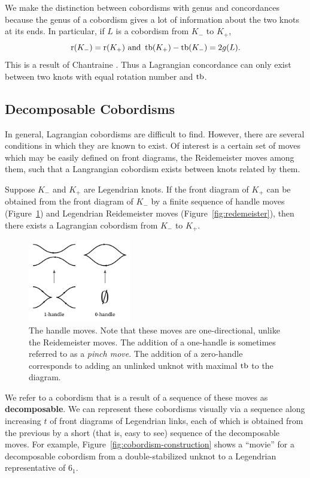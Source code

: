 We make the distinction between cobordisms with genus and concordances because the genus of a cobordism gives a lot of information about the two knots at its ends.
In particular, if $L$ is a cobordism from $K_-$ to $K_+$,
\[
    \operatorname{r}(K_-) = \operatorname{r}(K_+) \text{     and     } \operatorname{tb}(K_+) - \operatorname{tb}(K_-) = 2g(L).
\]
This is a result of Chantraine \cite{chantraine2010}. Thus a Lagrangian concordance can only exist between two knots with equal rotation number and $\operatorname{tb}$.


\subsection{Decomposable Cobordisms}\label{subsec:decomposable}

In general, Lagrangian cobordisms are difficult to find. However, there are several conditions in which they are known to exist. Of interest is a certain set of moves which may be easily defined on front diagrams, the Reidemeister moves among them, such that a Langrangian cobordism exists between knots related by them.

\begin{theorem}
    Suppose $K_-$ and $K_+$ are Legendrian knots. If the front diagram of $K_+$ can be obtained from the front diagram of $K_-$ by a finite sequence of handle moves (Figure~\ref{fig:handles}) and Legendrian Reidemeister moves (Figure~\ref{fig:redemeister}), then there exists a Lagrangian cobordism from $K_-$ to $K_+$. 
\end{theorem}
\begin{figure}[ht!]
    \centering
    \includegraphics[width=0.4\textwidth]{images/handles.pdf}
    \caption{The handle moves. Note that these moves are one-directional, unlike the Reidemeister moves. The addition of a one-handle is sometimes referred to as a \emph{pinch move}. The addition of a zero-handle corresponds to adding an unlinked unknot with maximal $\operatorname{tb}$ to the diagram.}
    \label{fig:handles}
\end{figure}

We refer to a cobordism that is a result of a sequence of these moves as \textbf{decomposable}. We can represent these cobordisms visually via a sequence along increasing $t$ of front diagrams of Legendrian links, each of which is obtained from the previous by a short (that is, easy to see) sequence of the decomposable moves. For example, Figure~\ref{fig:cobordism-construction} shows a ``movie'' for a decomposable cobordism from a double-stabilized unknot to a Legendrian representative of $6_1$.

